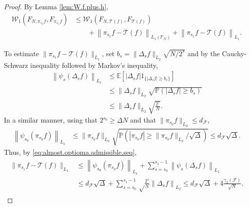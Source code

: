 \documentclass[10pt,a4paper]{amsart}
\newcommand{\E}{\mathbb{E}}
\renewcommand{\P}{\mathbb{P}}
\newcommand{\W}{\mathcal{W}}
\begin{document}
\begin{proof}
By Lemma \ref{lem:W.f.plus.h},
\begin{align*}
 \W_{1}(F_{N,\pi_{s_{1}}f}, F_{\pi_{s_{1}}f}) 
&\leq \W_{1}(F_{N,\mathcal{T}(f)}, F_{\mathcal{T}(f)} ) \\
&\qquad + \left\| \pi_{s_1}f- \mathcal{T}(f) \right\|_{L_{1}(\P_N )} + \left\|\pi_{s_1} f-\mathcal{T}(f)\right\|_{L_{1}}.
\end{align*}

To estimate $\|\pi_{s_1}f-\mathcal{T}(f) \|_{L_{1}}$, set $b_{s}= \|\Delta_{s} f\|_{L_{2}}\sqrt{N/2^s}$ and by the  Cauchy-Schwarz inequality followed by  Markov's inequality,
\begin{align*}
 \left\| \psi_{s}(\Delta_{s}f) \right\|_{L_{1}}
&\leq\E\left[ |\Delta_{s} f | 1_{\{ |\Delta_{s} f |\geq b_{s} \} } \right] \\
&\leq \|\Delta_{s} f \|_{L_{2}} \sqrt{ \P( |\Delta_{s} f |\geq b_{s}) }  \\
&\leq \|\Delta_{s} f \|_{L_{2}} \sqrt{ \frac{2^{s}}{N} }.
\end{align*}
In a similar manner, using that $2^{s_{0}}\geq  \Delta N$ and that $\|\pi_{s_{0}} f\|_{L_{2}}\leq d_{\mathcal{F}} $,
\begin{align*}
 \left\| \psi_{s_{0}}(\pi_{s_{0}}f) \right\|_{L_{1}}
&\leq \| \pi_{s_{0}} f \|_{L_{2}} \sqrt{ \P( |\pi_{s_{0}} f |\geq \|\pi_{s_{0}} f\|_{L_{2}}/\sqrt{\Delta}) }  
\leq   d_{\mathcal{F}}  \sqrt\Delta.
\end{align*}
Thus, by \eqref{eq:almost.optioma.admissible.seq},
\begin{align}
\label{eq:pi.s1.vs.T.some.eq}
\begin{split}
\| \pi_{s_1} f-\mathcal{T}(f) \|_{L_{1}}
&\leq \left\| \psi_{s_{0}}(\pi_{s_{0}}f) \right\|_{L_{1}} + \sum_{s=s_{0}}^{s_{1}-1} \left\| \psi_{s}(\Delta_{s}f) \right\|_{L_{1}}\\
&\leq  d_{\mathcal{F}} \sqrt\Delta  + \sum_{s=s_{0}}^{s_{1}-1}  \sqrt\frac{2^{s}}{N} \left\|\Delta_{s}f \right\|_{L_{2}}
\leq d_{\mathcal{F}}  \sqrt\Delta  + 4 \frac{\gamma_{2}(\mathcal{F})}{\sqrt N}.
\end{split}
\end{align}



\end{proof}
\end{document}
